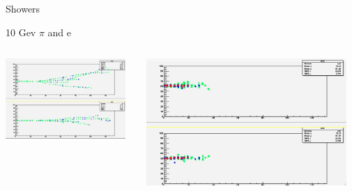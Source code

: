 \documentclass[10pt]{beamer}
\begin{document}
\begin{frame}{Showers}
  \begin{block}{10 Gev $\pi$ and e}
    \begin{columns}
      \begin{column}{0.5\textwidth}
        \centerline{\includegraphics[width=0.95\textwidth]{jpg/10GevPion.jpg}}
      \end{column}
      \begin{column}{0.5\textwidth}
        \centerline{\includegraphics[width=0.95\textwidth]{jpg/10GevElectron.jpg}}
      \end{column}
    \end{columns}
      

\end{block}
\end{frame}
\end{document}

